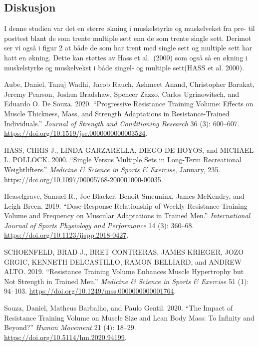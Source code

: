 \documentclass[
  letterpaper,
  DIV=11,
  numbers=noendperiod]{scrartcl}
\newlength{\cslhangindent}
\newlength{\cslentryspacingunit} %
\newenvironment{CSLReferences}[2] %
 {%
  \setlength{\parindent}{0pt}
  \ifodd #1
  \let\oldpar\par
  \def\par{\hangindent=\cslhangindent\oldpar}
  \fi
  \setlength{\parskip}{#2\cslentryspacingunit}
 }%
 {}
\begin{document}
\hypertarget{diskusjon}{%
\subsection{Diskusjon}\label{diskusjon}}

I denne studien var det en større økning i muskelstyrke og muskelvekst
fra pre- til posttest blant de som trente multiple sett enn de som
trente single sett. Derimot ser vi også i figur 2 at både de som har
trent med single sett og multiple sett har hatt en økning. Dette kan
støttes av Hass et al.~(2000) som også så en økning i muskelstyrke og
muskelvekst i både singel- og multiple sett(HASS et al. 2000).

\hypertarget{refs}{}
\begin{CSLReferences}{1}{0}
\leavevmode{}%
Aube, Daniel, Tanuj Wadhi, Jacob Rauch, Ashmeet Anand, Christopher
Barakat, Jeremy Pearson, Joshua Bradshaw, Spencer Zazzo, Carlos
Ugrinowitsch, and Eduardo O. De Souza. 2020. {``Progressive Resistance
Training Volume: Effects on Muscle Thickness, Mass, and Strength
Adaptations in Resistance-Trained Individuals.''} \emph{Journal of
Strength and Conditioning Research} 36 (3): 600--607.
\url{https://doi.org/10.1519/jsc.0000000000003524}.

\leavevmode{}%
HASS, CHRIS J., LINDA GARZARELLA, DIEGO DE HOYOS, and MICHAEL L.
POLLOCK. 2000. {``Single Versus Multiple Sets in Long-Term Recreational
Weightlifters.''} \emph{Medicine \& Science in Sports \& Exercise},
January, 235. \url{https://doi.org/10.1097/00005768-200001000-00035}.

\leavevmode{}%
Heaselgrave, Samuel R., Joe Blacker, Benoit Smeuninx, James McKendry,
and Leigh Breen. 2019. {``Dose-Response Relationship of Weekly
Resistance-Training Volume and Frequency on Muscular Adaptations in
Trained Men.''} \emph{International Journal of Sports Physiology and
Performance} 14 (3): 360--68.
\url{https://doi.org/10.1123/ijspp.2018-0427}.

\leavevmode{}%
SCHOENFELD, BRAD J., BRET CONTRERAS, JAMES KRIEGER, JOZO GRGIC, KENNETH
DELCASTILLO, RAMON BELLIARD, and ANDREW ALTO. 2019. {``Resistance
Training Volume Enhances Muscle Hypertrophy but Not Strength in Trained
Men.''} \emph{Medicine \& Science in Sports \& Exercise} 51 (1):
94--103. \url{https://doi.org/10.1249/mss.0000000000001764}.

\leavevmode{}%
Souza, Daniel, Matheus Barbalho, and Paulo Gentil. 2020. {``The Impact
of Resistance Training Volume on Muscle Size and Lean Body Mass: To
Infinity and Beyond?''} \emph{Human Movement} 21 (4): 18--29.
\url{https://doi.org/10.5114/hm.2020.94199}.

\end{CSLReferences}
\end{document}
